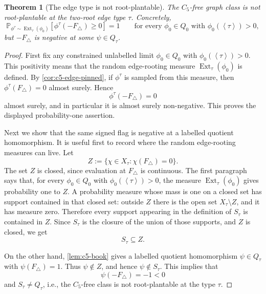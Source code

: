 \documentclass[11pt]{article}
\newtheorem{theorem}{Theorem}
\theoremstyle{definition}
\newcommand{\Prob}{\mathbb{P}}
\newcommand{\Ext}{\operatorname{Ext}}
\newcommand{\brak}[1]{\left\langle #1\right\rangle}
\begin{document}
\begin{theorem}[The edge type is not root-plantable]\label{thm:c5-edge-not-root-plantable}
The $C_5$-free graph class is not root-plantable at the two-root edge type
$\tau$.  Concretely,
\[
  \Prob_{\phi^\tau\sim\Ext_\tau(\phi_0)}[\phi^\tau(-F_\triangle)\ge0]=1
  \qquad\text{for every }\phi_0\in Q_0\text{ with }\phi_0(\brak{\tau})>0,
\]
but $-F_\triangle$ is negative at some $\psi\in Q_\tau$.
\end{theorem}

\begin{proof}
First fix any constrained unlabelled limit $\phi_0\in Q_0$ with
$\phi_0(\brak\tau)>0$.  This positivity means that the random edge-rooting measure
$\Ext_\tau(\phi_0)$ is defined.  By \cref{cor:c5-edge-pinned}, if
$\phi^\tau$ is sampled from this measure, then
$\phi^\tau(F_\triangle)=0$ almost surely.  Hence
\[
  \phi^\tau(-F_\triangle)=0
\]
almost surely, and in particular it is almost surely non-negative.  This proves the
displayed probability-one assertion.

Next we show that the same signed flag is negative at a labelled quotient homomorphism.
It is useful first to record where the random edge-rooting measures can live.  Let
\[
  Z:=\{\chi\in X_\tau:\chi(F_\triangle)=0\}.
\]
The set $Z$ is closed, since evaluation at $F_\triangle$ is continuous.  The first
paragraph says that, for every $\phi_0\in Q_0$ with $\phi_0(\brak\tau)>0$, the measure
$\Ext_\tau(\phi_0)$ gives probability one to $Z$.  A probability measure whose mass is
one on a closed set has support contained in that closed set: outside $Z$ there is the
open set $X_\tau\setminus Z$, and it has measure zero.  Therefore every support appearing
in the definition of $S_\tau$ is contained in $Z$.  Since $S_\tau$ is the closure of the
union of those supports, and $Z$ is closed, we get
\[
  S_\tau\subseteq Z .
\]

On the other hand, \cref{lem:c5-book} gives a labelled quotient homomorphism
$\psi\in Q_\tau$ with $\psi(F_\triangle)=1$.  Thus $\psi\notin Z$, and hence
$\psi\notin S_\tau$.  This implies that
\[
  \psi(-F_\triangle)=-1<0
\]
and $S_\tau\ne Q_\tau$, i.e., the $C_5$-free class is not root-plantable at the type $\tau$.
\end{proof}
\end{document}
